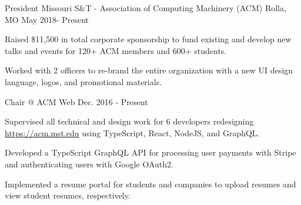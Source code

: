 \begin{cventries}

\cventry
  {President} %
  {Missouri S\&T - Association of Computing Machinery (ACM)} %
  {Rolla, MO} %
  {May 2018- Present} %
  {
    \begin{cvitems} %
      \item {Raised \$11,500 in total corporate sponsorship to fund existing and
             develop new talks and events for 120+ ACM members and 600+ students.}
      \item {Worked with 2 officers to re-brand the entire organization
             with a new UI design language, logos, and promotional materials.}
    \end{cvitems}
  }

\cventry
  {Chair @ ACM Web} %
  {} %
  {} %
  {Dec. 2016 - Present} %
  {
    \begin{cvitems} %
      \item {Supervised all technical and design work for 6 developers
             redesigning \url{https://acm.mst.edu} using TypeScript, React,
             NodeJS, and GraphQL.}
      \item {Developed a TypeScript GraphQL API for processing user payments
             with Stripe and authenticating users with Google OAuth2.}
       \item {Implemented a resume portal for students and companies to upload resumes
              and view student resumes, respectively.}
    \end{cvitems}
  }




\end{cventries}
